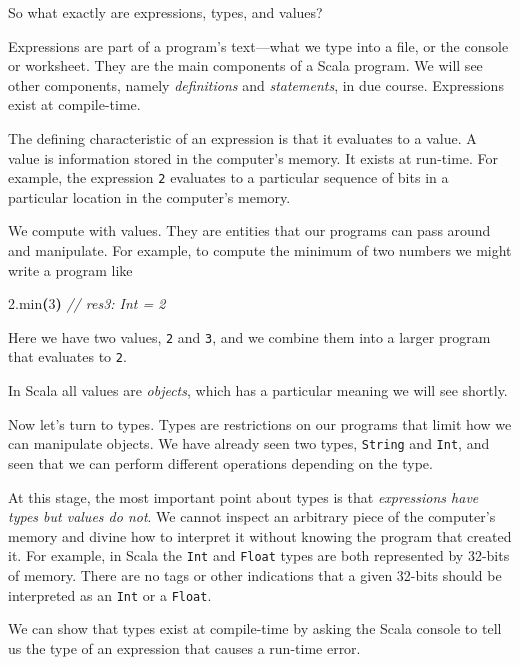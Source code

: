 \documentclass[11pt,a5paper,]{book}
\newenvironment{Shaded}{\begin{snugshade}}{\end{snugshade}}
\newcommand{\CommentTok}[1]{\textcolor[rgb]{0.56,0.35,0.01}{\textit{#1}}}
\newcommand{\DecValTok}[1]{\textcolor[rgb]{0.00,0.00,0.81}{#1}}
\newcommand{\FloatTok}[1]{\textcolor[rgb]{0.00,0.00,0.81}{#1}}
\newcommand{\FunctionTok}[1]{\textcolor[rgb]{0.00,0.00,0.00}{#1}}
\newcommand{\OperatorTok}[1]{\textcolor[rgb]{0.81,0.36,0.00}{\textbf{#1}}}
\begin{document}
So what exactly are expressions, types, and values?

Expressions are part of a program's text---what we type into a file, or
the console or worksheet. They are the main components of a Scala
program. We will see other components, namely \emph{definitions} and
\emph{statements}, in due course. Expressions exist at compile-time.

The defining characteristic of an expression is that it evaluates to a
value. A value is information stored in the computer's memory. It exists
at run-time. For example, the expression \texttt{2} evaluates to a
particular sequence of bits in a particular location in the computer's
memory.

We compute with values. They are entities that our programs can pass
around and manipulate. For example, to compute the minimum of two
numbers we might write a program like

\begin{Shaded}
\begin{Highlighting}[]
\FloatTok{2.}\FunctionTok{min}\OperatorTok{(}\DecValTok{3}\OperatorTok{)}
\CommentTok{// res3: Int = 2}
\end{Highlighting}
\end{Shaded}

Here we have two values, \texttt{2} and \texttt{3}, and we combine them
into a larger program that evaluates to \texttt{2}.

In Scala all values are \emph{objects}, which has a particular meaning
we will see shortly.

Now let's turn to types. Types are restrictions on our programs that
limit how we can manipulate objects. We have already seen two types,
\texttt{String} and \texttt{Int}, and seen that we can perform different
operations depending on the type.

At this stage, the most important point about types is that
\emph{expressions have types but values do not}. We cannot inspect an
arbitrary piece of the computer's memory and divine how to interpret it
without knowing the program that created it. For example, in Scala the
\texttt{Int} and \texttt{Float} types are both represented by 32-bits of
memory. There are no tags or other indications that a given 32-bits
should be interpreted as an \texttt{Int} or a \texttt{Float}.

We can show that types exist at compile-time by asking the Scala console
to tell us the type of an expression that causes a run-time error.
\end{document}

